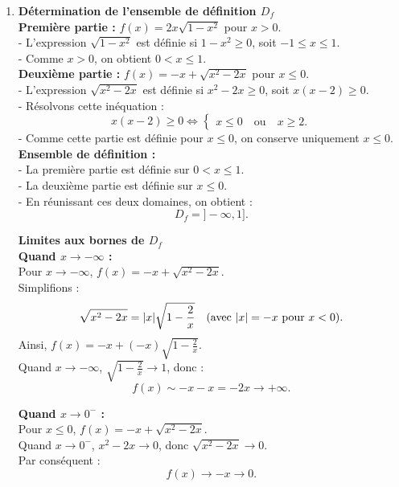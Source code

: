 \documentclass{article}
\begin{document}
\begin{enumerate}
    \item \textbf{Détermination de l'ensemble de définition \( D_f \)} \\
    \textbf{Première partie :} \( f(x) = 2x\sqrt{1 - x^2} \) pour \( x > 0 \). \\
    - L'expression \( \sqrt{1 - x^2} \) est définie si \( 1 - x^2 \geq 0 \), soit \( -1 \leq x \leq 1 \). \\
    - Comme \( x > 0 \), on obtient \( 0 < x \leq 1 \). \\

    \textbf{Deuxième partie :} \( f(x) = -x + \sqrt{x^2 - 2x} \) pour \( x \leq 0 \). \\
    - L'expression \( \sqrt{x^2 - 2x} \) est définie si \( x^2 - 2x \geq 0 \), soit \( x(x - 2) \geq 0 \). \\
    - Résolvons cette inéquation :
    \[
    x(x - 2) \geq 0 \iff
    \begin{cases} 
    x \leq 0 \quad \text{ou} \quad x \geq 2.
    \end{cases}
    \]
    - Comme cette partie est définie pour \( x \leq 0 \), on conserve uniquement \( x \leq 0 \). \\

    \textbf{Ensemble de définition :} \\
    - La première partie est définie sur \( 0 < x \leq 1 \). \\
    - La deuxième partie est définie sur \( x \leq 0 \). \\
    - En réunissant ces deux domaines, on obtient :
    \[
    D_f = ]-\infty, 1].
    \]
    
   \textbf{Limites aux bornes de \( D_f \)} \\

    \textbf{Quand \( x \to -\infty \) :} \\
    Pour \( x \to -\infty \), \( f(x) = -x + \sqrt{x^2 - 2x} \). \\
    Simplifions :
    \[
    \sqrt{x^2 - 2x} = |x| \sqrt{1 - \frac{2}{x}} \quad \text{(avec \( |x| = -x \) pour \( x < 0 \))}.
    \]
    Ainsi, \( f(x) = -x + (-x)\sqrt{1 - \frac{2}{x}} \). \\
    Quand \( x \to -\infty \), \( \sqrt{1 - \frac{2}{x}} \to 1 \), donc :
    \[
    f(x) \sim -x - x = -2x \to +\infty.
    \]

    \textbf{Quand \( x \to 0^- \) :} \\
    Pour \( x \leq 0 \), \( f(x) = -x + \sqrt{x^2 - 2x} \). \\
    Quand \( x \to 0^- \), \( x^2 - 2x \to 0 \), donc \( \sqrt{x^2 - 2x} \to 0 \). \\
    Par conséquent :
    \[
    f(x) \to -x \to 0.
    \]


\end{enumerate}
\end{document}
